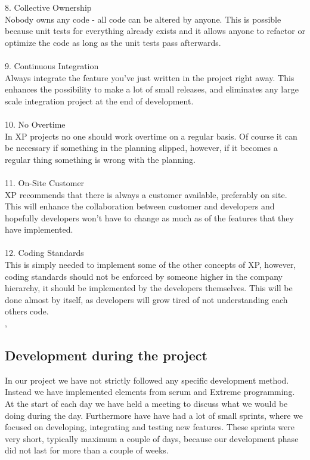 \begin{itemize}
8. Collective Ownership\\
Nobody owns any code - all code can be altered by anyone. This is possible because unit tests for everything already exists and it allows anyone to refactor or optimize the code as long as the unit tests pass afterwards.\\
\\
9. Continuous Integration\\
Always integrate the feature you've just written in the project right away. This enhances the possibility to make a lot of small releases, and eliminates any large scale integration project at the end of development.\\
\\
10. No Overtime\\
In XP projects no one should work overtime on a regular basis. Of course it can be necessary if something in the planning slipped, however, if it becomes a regular thing something is wrong with the planning.\\
\\
11. On-Site Customer\\
XP recommends that there is always a customer available, preferably on site. This will enhance the collaboration between customer and developers and hopefully developers won't have to change as much as of the features that they have implemented.\\
\\
12. Coding Standards\\
This is simply needed to implement some of the other concepts of XP, however, coding standards should not be enforced by someone higher in the company hierarchy, it should be implemented by the developers themselves. This will be done almost by itself, as developers will grow tired of not understanding each others code. \\

\cite{xp}, \cite{xp2}
\subsection{Development during the project}
In our project we have not strictly followed any specific development method. Instead we have implemented elements from scrum and Extreme programming. At the start of each day we have held a meeting to discuss what we would be doing during the day. Furthermore have have had a lot of small sprints, where we focused on developing, integrating and testing new features. These sprints were very short, typically maximum a couple of days, because our development phase did not last for more than a couple of weeks.


\end{itemize}
